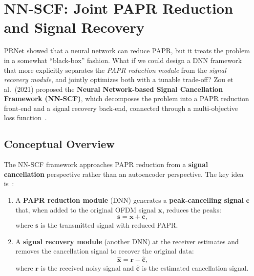 \chapter{NN-SCF: Joint PAPR Reduction and Signal Recovery}
\label{ch:nn_scf}

\begin{motivation}
    PRNet showed that a neural network can reduce PAPR, but it treats the
    problem in a somewhat ``black-box'' fashion.
    What if we could design a DNN framework that more explicitly separates
    the \emph{PAPR reduction module} from the \emph{signal recovery module},
    and jointly optimizes both with a tunable trade-off?
    Zou et al.\ (2021) proposed the \textbf{Neural Network-based Signal
    Cancellation Framework (NN-SCF)}, which decomposes the problem into
    a PAPR reduction front-end and a signal recovery back-end, connected
    through a multi-objective loss function~\cite{zou2021novel}.
\end{motivation}


\section{Conceptual Overview}
\label{sec:nnscf_concept}

The NN-SCF framework approaches PAPR reduction from a \textbf{signal
cancellation} perspective rather than an autoencoder perspective.
The key idea is~\cite{zou2021novel}:

\begin{enumerate}
    \item A \textbf{PAPR reduction module} (DNN) generates a
          \textbf{peak-cancelling signal} $\bm{c}$ that, when added to the
          original OFDM signal $\bm{x}$, reduces the peaks:
          \begin{equation}
              \bm{s} = \bm{x} + \bm{c},
              \label{eq:nnscf_transmission}
          \end{equation}
          where $\bm{s}$ is the transmitted signal with reduced PAPR.

    \item A \textbf{signal recovery module} (another DNN) at the receiver
          estimates and removes the cancellation signal to recover the
          original data:
          \begin{equation}
              \hat{\bm{x}} = \bm{r} - \hat{\bm{c}},
              \label{eq:nnscf_recovery}
          \end{equation}
          where $\bm{r}$ is the received noisy signal and $\hat{\bm{c}}$
          is the estimated cancellation signal.
\end{enumerate}

